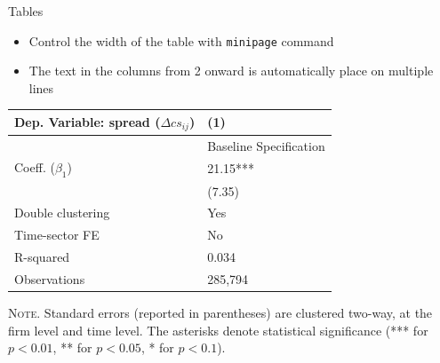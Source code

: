 \documentclass[10pt]{beamer}
\begin{document}
\begin{frame}
	{Tables}
	\begin{itemize}
		\item Control the width of the table with \texttt{minipage} command \medskip
		\item The text in the columns from 2 onward is automatically place on multiple lines
	\end{itemize}
	\begin{table}[th]
		\centering%
		\begin{minipage}[b]{.4\textwidth}
			\vspace{.2cm}\tablesize
			\begin{tabularx}{\textwidth}{lY}
				\toprule
				Dep. Variable: spread ($\Delta cs_{ij}$) 	& (1)\\
				\midrule
				& {Baseline Specification} \\
				\midrule
				 Coeff. ($\beta_1$) 		&  21.15*** \\
				&   (7.35) \\
				\midrule
				 Double clustering 		& Yes \\
				Time-sector FE 												& No \\
				 R-squared 					& 0.034 \\
				Observations 												& 285,794 \\\bottomrule
			\end{tabularx}\vspace{.2cm}\newline
			\tiny{{\scshape Note.} Standard errors (reported in parentheses) are clustered two-way, at the firm level and time level. The asterisks denote statistical significance (*** for $p<0.01$, ** for $p<0.05$, * for $p<0.1$).\newline}%
			\label{tab:label}%
		\end{minipage}
	\end{table}
\end{frame}

\end{document}
